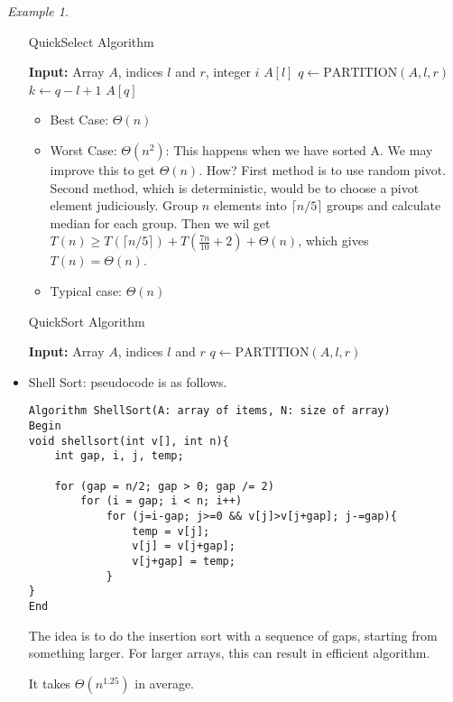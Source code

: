 \documentclass{article}
\theoremstyle{remark}
\newtheorem{example}{Example}
\begin{document}
\begin{example}
\begin{itemize}
\begin{algorithm}
    \caption{QuickSelect Algorithm}
    \begin{algorithmic}[1] %
    \State \textbf{Input:} Array $A$, indices $l$ and $r$, integer $i$
            \State \Return $A[l]$
        \EndIf
        \State $q \gets \text{PARTITION}(A, l, r)$
        \State $k \gets q - l + 1$
            \State \Return $A[q]$
            \State \Return {}
        \Else
            \State \Return {}
        \EndIf
    \EndFunction
    \end{algorithmic}
\end{algorithm}
    \begin{itemize}
    \item Best Case: $\Theta(n)$
    \item Worst Case: $\Theta(n^2)$: This happens when we have sorted A. We may improve this to get $\Theta(n)$. How? First method is to use random pivot. 
    Second method, which is deterministic, would be to choose a pivot element judiciously. Group $n$ elements into $\lceil n/5 \rceil$ groups and calculate median for each group.  Then 
    we wil get $T(n)\geq T(\lceil n/5\rceil) + T(\frac {7n}{10}+2)+\Theta(n)$, which gives $T(n)=\Theta(n)$.
    \item Typical case: $\Theta(n)$
    \end{itemize}
\begin{algorithm}
    \caption{QuickSort Algorithm}
    \begin{algorithmic}[1]
    \State \textbf{Input:} Array \( A \), indices \( l \) and \( r \)
            \State $q \gets \text{PARTITION}(A, l, r)$
        \EndIf
    \EndFunction
    \end{algorithmic}
\end{algorithm}
\item Shell Sort: pseudocode is as follows.
\begin{verbatim}
Algorithm ShellSort(A: array of items, N: size of array)
Begin
void shellsort(int v[], int n){
    int gap, i, j, temp;

    for (gap = n/2; gap > 0; gap /= 2)
        for (i = gap; i < n; i++)
            for (j=i-gap; j>=0 && v[j]>v[j+gap]; j-=gap){
                temp = v[j];
                v[j] = v[j+gap];
                v[j+gap] = temp;
            }
}
End
\end{verbatim}
The idea is to do the insertion sort with a sequence of gaps, starting from something larger. For larger arrays, this can result in efficient algorithm.

It takes $\Theta(n^{1.25})$ in average.
\end{itemize}
\end{example}
\end{document}
